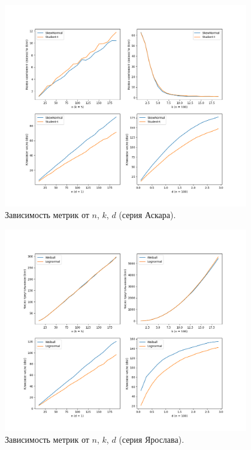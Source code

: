 \documentclass[a4paper,12pt]{article}
\begin{document}
\begin{figure}[H]
    \centering
    \includegraphics[width=0.95\textwidth]{part2_results_Askar.png}
    \caption{Зависимость метрик от $n$, $k$, $d$ (серия Аскара).}
    \label{fig:part2-askar}
\end{figure}

\begin{figure}[H]
    \centering
    \includegraphics[width=0.95\textwidth]{part2_results_Yaroslav.png}
    \caption{Зависимость метрик от $n$, $k$, $d$ (серия Ярослава).}
    \label{fig:part2-yaroslav}
\end{figure}
\end{document}
